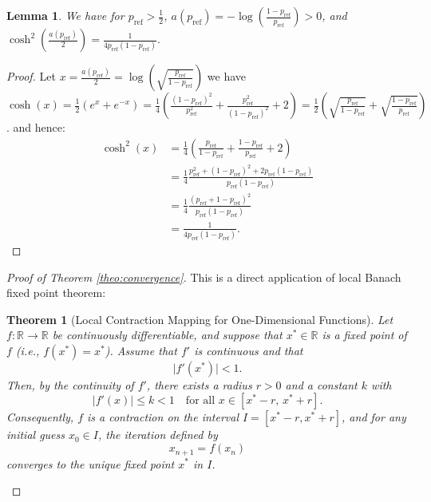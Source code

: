 \documentclass[11pt,reqno]{amsart}
\newtheorem{theorem}{Theorem}
\newtheorem{lemma}{Lemma}
\begin{document}
\begin{lemma}
We have for $p_{\mathrm{ref}}>\frac{1}{2}$, $a(p_{\mathrm{ref}}) = - \log(\frac{1-p_{\mathrm{ref}}}{p_{\mathrm{ref}}}) >0$, and $\cosh^2(\frac{a(p_{\mathrm{ref}})}{2})=\frac{1}{4p_{\mathrm{ref}}(1-p_{\mathrm{ref}})}.$
\end{lemma}
\begin{proof} Let $x= \frac{a(p_{\mathrm{ref}})}{2}=\log( \sqrt{\frac{p_{\mathrm{ref}}}{1-p_{\mathrm{ref}}}})$ we have
$\cosh(x) =\frac{1}{2} (e^{x} + e^{-x})= \frac{1}{4} ( \frac{(1-p_{\mathrm{ref}})^2}{p_{\mathrm{ref}}^2} + \frac{p_{\mathrm{ref}}^2}{(1-p_{\mathrm{ref}})^2}+2  ) = \frac{1}{2} ( \sqrt{\frac{p_{\mathrm{ref}}}{1-p_{\mathrm{ref}}}} + \sqrt{\frac{1-p_{\mathrm{ref}}}{p_{\mathrm{ref}}}}) $. 
and hence:
\begin{align*}
\cosh^2(x) &= \frac{1}{4} \left( \frac{p_{\mathrm{ref}}}{1-p_{\mathrm{ref}}} + \frac{1-p_{\mathrm{ref}}}{p_{\mathrm{ref}}}  +2\right) \\
& = \frac{1}{4}  \frac{p_{\mathrm{ref}}^2 + (1-p_{\mathrm{ref}})^2 + 2p_{\mathrm{ref}}(1-p_{\mathrm{ref}})}{p_{\mathrm{ref}}(1-p_{\mathrm{ref}})}\\
& =  \frac{1}{4}  \frac{ (p_{\mathrm{ref}} + 1-p_{\mathrm{ref}})^2}{p_{\mathrm{ref}}(1-p_{\mathrm{ref}})}\\
& = \frac{1}{4p_{\mathrm{ref}}(1-p_{\mathrm{ref}})}.
\end{align*}
\end{proof}
\fi

\begin{proof}[Proof of Theorem \ref{theo:convergence}] This is a direct application of local Banach fixed point theorem:


\begin{theorem}[Local Contraction Mapping for One-Dimensional Functions]
Let \( f : \mathbb{R} \to \mathbb{R} \) be continuously differentiable, and suppose that \( x^* \in \mathbb{R} \) is a fixed point of \( f \) (i.e., \( f(x^*) = x^* \)). Assume that \( f' \) is continuous and that
\[
\lvert f'(x^*) \rvert < 1.
\]
Then, by the continuity of \( f' \), there exists a radius \( r > 0 \) and a constant \( k \) with
\[
\lvert f'(x) \rvert \le k < 1 \quad \text{for all } x \in [x^*-r, \, x^*+r].
\]
Consequently, \( f \) is a contraction on the interval \( I = [x^* - r, x^* + r] \), and for any initial guess \( x_0 \in I \), the iteration defined by
\[
x_{n+1} = f(x_n)
\]
converges to the unique fixed point \( x^* \) in \( I \).
\end{theorem}

\end{proof}
\end{document}
